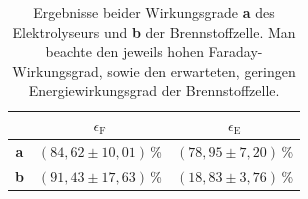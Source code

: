 \documentclass[a4paper,usenatbib]{aspdoc}
\begin{document}
            \begin{table}
                \centering
                \begin{tabular}{c|c|c}
                    \multicolumn{1}{c}{} & \multicolumn{1}{c|}{$\epsilon_{\mathrm{F}}$} & \multicolumn{1}{c}{$\epsilon_{\mathrm{E}}$}\\
                    \cmidrule(lr){2-2}\cmidrule(lr){3-3}
                    \toprule
                    \textbf{a}  & $(84,62 \pm 10,01)$\,\% & $(78,95 \pm 7,20)$\,\% \\
                    \textbf{b}    & $(91,43 \pm 17,63)$\,\% & $(18,83 \pm 3,76)$\,\% \\
                    \bottomrule
                \end{tabular}
                \caption{Ergebnisse beider Wirkungsgrade \textbf{a} des Elektrolyseurs und \textbf{b} der Brennstoffzelle. Man beachte den jeweils hohen Faraday-Wirkungsgrad, sowie den erwarteten, geringen Energiewirkungsgrad der Brennstoffzelle.}
                \label{tab:wirkung}
            \end{table}
            
\end{document}
